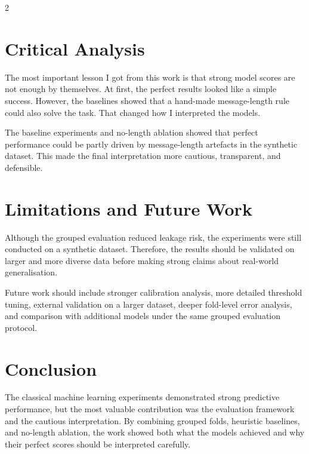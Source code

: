 \documentclass[10pt,a4paper]{article}
\begin{document}
\begin{multicols}{2}

\section{Critical Analysis}

The most important lesson I got from this work is that strong model scores are not enough by themselves. At first, the perfect results looked like a simple success. However, the baselines showed that a hand-made message-length rule could also solve the task. That changed how I interpreted the models.

The baseline experiments and no-length ablation showed that perfect performance could be partly driven by message-length artefacts in the synthetic dataset. This made the final interpretation more cautious, transparent, and defensible.

\section{Limitations and Future Work}

Although the grouped evaluation reduced leakage risk, the experiments were still conducted on a synthetic dataset. Therefore, the results should be validated on larger and more diverse data before making strong claims about real-world generalisation.

Future work should include stronger calibration analysis, more detailed threshold tuning, external validation on a larger dataset, deeper fold-level error analysis, and comparison with additional models under the same grouped evaluation protocol.

\section{Conclusion}


The classical machine learning experiments demonstrated strong predictive performance, but the most valuable contribution was the evaluation framework and the cautious interpretation. By combining grouped folds, heuristic baselines, and no-length ablation, the work showed both what the models achieved and why their perfect scores should be interpreted carefully.

\end{multicols}
\end{document}
